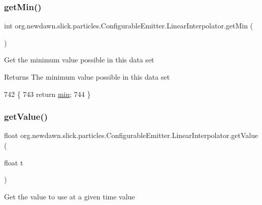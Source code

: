 \subsubsection{\texorpdfstring{get\+Min()}{getMin()}}
{\footnotesize\ttfamily int org.\+newdawn.\+slick.\+particles.\+Configurable\+Emitter.\+Linear\+Interpolator.\+get\+Min (\begin{DoxyParamCaption}{ }\end{DoxyParamCaption})\hspace{0.3cm}{\ttfamily [inline]}}

Get the minimum value possible in this data set

\begin{DoxyReturn}{Returns}
The minimum value possible in this data set 
\end{DoxyReturn}

\begin{DoxyCode}
742                             \{
743             \textcolor{keywordflow}{return} \mbox{\hyperlink{classorg_1_1newdawn_1_1slick_1_1particles_1_1_configurable_emitter_1_1_linear_interpolator_aa1aa9af8efa3ec59587abfb5a4831e42}{min}};
744         \}
\end{DoxyCode}
\mbox{\label{classorg_1_1newdawn_1_1slick_1_1particles_1_1_configurable_emitter_1_1_linear_interpolator_a7fb3f27e9869dfbbadf4582335dff74e}} 
\subsubsection{\texorpdfstring{get\+Value()}{getValue()}}
{\footnotesize\ttfamily float org.\+newdawn.\+slick.\+particles.\+Configurable\+Emitter.\+Linear\+Interpolator.\+get\+Value (\begin{DoxyParamCaption}\item[{float}]{t }\end{DoxyParamCaption})\hspace{0.3cm}{\ttfamily [inline]}}

Get the value to use at a given time value


